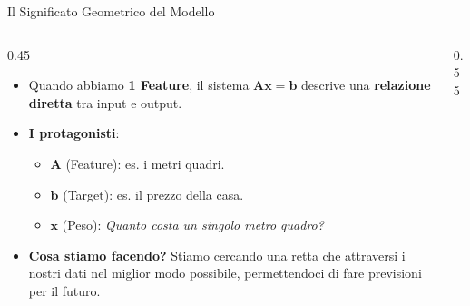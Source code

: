 \documentclass[aspectratio=169, 10pt]{beamer}
\begin{document}
\begin{frame}{Il Significato Geometrico del Modello}
    \begin{columns}[T]
        \begin{column}{0.45\textwidth}
            \vspace{0.2cm}
            \small
            \begin{itemize}
                \setlength\itemsep{1.2em}
                \item Quando abbiamo \textbf{1 Feature}, il sistema $\mathbf{A}\mathbf{x}=\mathbf{b}$ descrive una \textbf{relazione diretta} tra input e output.
                
                \item \textbf{I protagonisti}:
                \begin{itemize}
                    \item $\mathbf{A}$ (Feature): es. i metri quadri.
                    \item $\mathbf{b}$ (Target): es. il prezzo della casa.
                    \item $\mathbf{x}$ (Peso): \emph{Quanto costa un singolo metro quadro?}
                \end{itemize}
                
                \item \textbf{Cosa stiamo facendo?}
                Stiamo cercando una retta che attraversi i nostri dati nel miglior modo possibile, permettendoci di fare previsioni per il futuro.
            \end{itemize}
        \end{column}
        
        \begin{column}{0.55\textwidth}
            \centering
\end{column}
\end{columns}
\end{frame}
\end{document}
